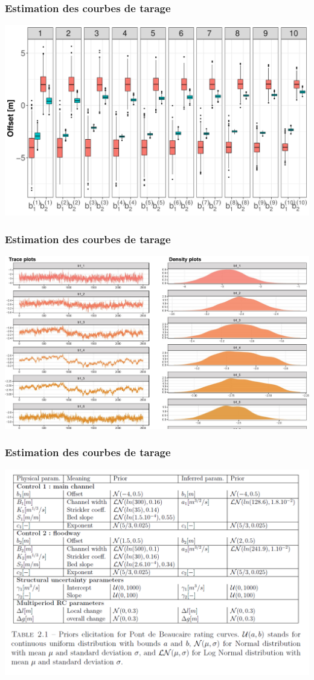 \documentclass[compress,9pt]{beamer}
\begin{document}
    	\begin{frame}
    		\frametitle{Estimation des courbes de tarage}
    		\centering
    		\includegraphics[width = .8\textwidth]{./Figures/SPDbs.pdf} 	
    	\end{frame}
    	
    	\begin{frame}
    		\frametitle{Estimation des courbes de tarage}
    		\centering
    		\includegraphics[width = .8\textwidth]{./Figures/SPDmcmc.jpg} 	
    	\end{frame}

    	
    	\begin{frame}
    		\frametitle{Estimation des courbes de tarage}
    		\centering
    		\includegraphics[width = .8\textwidth]{./Figures/SPDprior.png} 	
    	\end{frame}
    	    	    	
\end{document}
